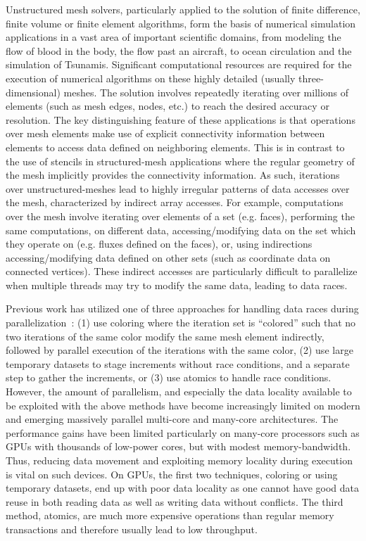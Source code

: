 
\noindent Unstructured mesh solvers, particularly applied to the solution of 
finite difference, finite volume or finite element algorithms, form the basis 
of numerical simulation applications in a vast area of important scientific 
domains, from modeling the flow of blood in the body, the flow past an aircraft, 
to ocean circulation and the simulation of Tsunamis. Significant computational 
resources are required for the execution of numerical algorithms on these highly 
detailed (usually three-dimensional) meshes. The solution involves repeatedly 
iterating over millions of elements (such as mesh edges, nodes, etc.) to reach 
the desired accuracy or resolution. The key distinguishing feature of these 
applications is that operations over mesh elements make use of explicit 
connectivity information between elements to access data defined on neighboring 
elements. This is in contrast to the use of stencils in structured-mesh 
applications where the regular geometry of the mesh implicitly provides the 
connectivity information. As such, iterations over unstructured-meshes lead to 
highly irregular patterns of data accesses over the mesh, characterized by 
indirect array accesses. For example, computations over the mesh involve 
iterating over elements of a set (e.g. faces), performing the same computations, 
on different data, accessing/modifying data on the set which they operate on 
(e.g. fluxes defined on the faces), or, using indirections accessing/modifying 
data defined on other sets (such as coordinate data on connected vertices). 
These indirect accesses are particularly difficult to parallelize when multiple 
threads may try to modify the same data, leading to data races. 

Previous work has utilized one of three approaches for handling data races 
during parallelization~\cite{LULESH:spec,miniaero}: (1) use coloring where the 
iteration set is ``colored'' such that no two iterations of the same color 
modify the same mesh element indirectly, followed by parallel execution of the 
iterations with the same color, (2) use large temporary datasets to 
stage increments without race conditions, and a separate step to gather the 
increments, or (3) use atomics to handle race conditions. However, the amount of 
parallelism, and especially the data locality available to be 
exploited with the above methods have become increasingly limited on modern and 
emerging massively parallel multi-core and many-core architectures. The 
performance gains have been limited particularly on many-core processors such as 
GPUs with thousands of low-power cores, but with modest memory-bandwidth. 
Thus, reducing data movement and exploiting memory locality during execution is 
vital on such devices. On GPUs, the first two techniques, coloring or using 
temporary datasets, end up with poor data locality as one cannot have good data 
reuse in both reading data as well as writing data without conflicts. The third 
method, atomics, are much more expensive operations than regular memory 
transactions and therefore usually lead to low throughput. 

